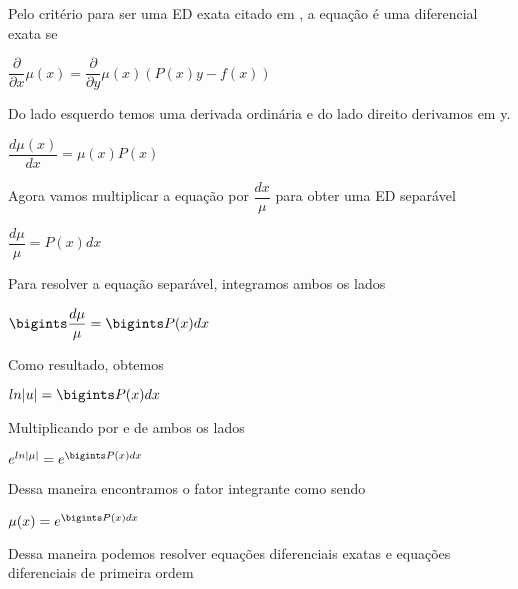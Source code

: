 Pelo critério para ser uma ED exata citado em \cite{explicacaoEDO}, a equação é uma diferencial exata se 

\begin{center}
$ \dfrac{\partial}{\partial x}\mu(x) = \dfrac{\partial}{\partial y}\mu(x)(P(x)y - f(x))  $ 
\end{center}


Do lado esquerdo temos uma derivada ordinária e do lado direito derivamos em y. 

\begin{center}
$ \dfrac{d\mu(x)}{dx} = \mu(x)P(x) $
\end{center}

Agora vamos multiplicar a equação por $ \dfrac{dx}{\mu} $ para obter uma ED separável

\begin{center}
$ \dfrac{d\mu}{\mu} = P(x)dx $
\end{center}


Para resolver a equação separável, integramos ambos os lados

\begin{center}
$ \bigints \dfrac{d\mu}{\mu} = \bigints P(x)dx $
\end{center}

Como resultado, obtemos

\begin{center}
$ ln|u| =  \bigints P(x)dx $
\end{center}

Multiplicando por e de ambos os lados

\begin{center}
$ e^{ln|\mu|} = e^{\bigints P(x)dx} $
\end{center}

Dessa maneira encontramos o fator integrante como sendo

\begin{center}
$ \mu(x) = e^{\bigints P(x)dx} $
\end{center}

Dessa maneira podemos resolver equações diferenciais exatas e equações diferenciais de primeira ordem
